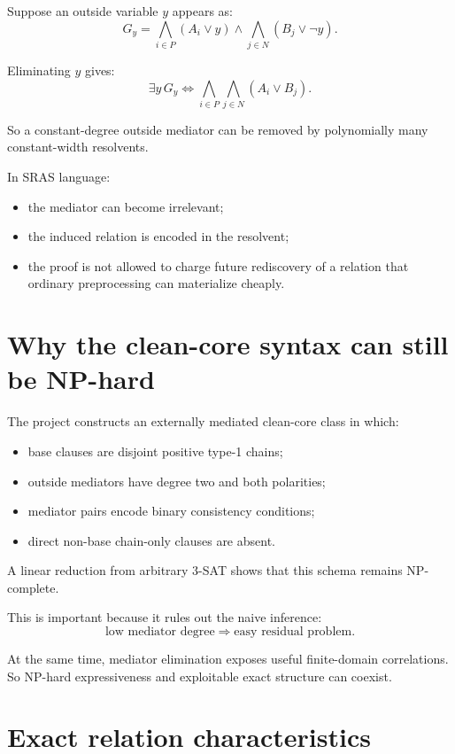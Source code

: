 \documentclass[11pt]{article}
\theoremstyle{plain}
\theoremstyle{definition}
\theoremstyle{remark}
\begin{document}
Suppose an outside variable \(y\) appears as:
\[
G_y
=
\bigwedge_{i\in P}(A_i\vee y)
\wedge
\bigwedge_{j\in N}(B_j\vee\neg y).
\]

Eliminating \(y\) gives:
\[
\exists y\,G_y
\iff
\bigwedge_{i\in P}
\bigwedge_{j\in N}
(A_i\vee B_j).
\]

So a constant-degree outside mediator can be removed by polynomially many
constant-width resolvents.

In SRAS language:
\begin{itemize}[leftmargin=1.4em]
\item the mediator can become irrelevant;
\item the induced relation is encoded in the resolvent;
\item the proof is not allowed to charge future rediscovery of a relation that
ordinary preprocessing can materialize cheaply.
\end{itemize}

\section{Why the clean-core syntax can still be NP-hard}

The project constructs an externally mediated clean-core class in which:
\begin{itemize}[leftmargin=1.4em]
\item base clauses are disjoint positive type-1 chains;
\item outside mediators have degree two and both polarities;
\item mediator pairs encode binary consistency conditions;
\item direct non-base chain-only clauses are absent.
\end{itemize}

A linear reduction from arbitrary 3-SAT shows that this schema remains
NP-complete.

This is important because it rules out the naive inference:
\[
\text{low mediator degree}
\Rightarrow
\text{easy residual problem}.
\]

At the same time, mediator elimination exposes useful finite-domain
correlations.  So NP-hard expressiveness and exploitable exact structure can
coexist.

\section{Exact relation characteristics}
\end{document}
